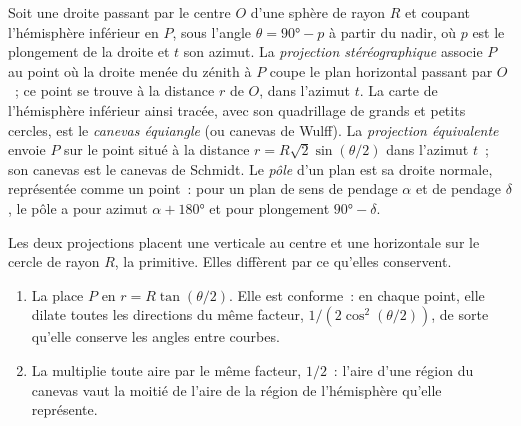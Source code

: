 \begin{definition}\label{def:b3:structural-analysis:stereo}
Soit une droite passant par le centre $O$ d'une sphère de rayon $R$ et coupant
l'hémisphère inférieur en $P$, sous l'angle $\theta = \ang{90} - p$ à partir du nadir, où
$p$ est le plongement de la droite et $t$ son azimut. La \emph{projection
stéréographique} associe $P$ au point où la
droite menée du zénith à $P$ coupe le plan horizontal passant par
$O$~; ce point se trouve à la distance $r$ de $O$, dans l'azimut $t$. La
carte de l'hémisphère inférieur ainsi tracée, avec son quadrillage de grands et petits
cercles, est le \emph{canevas équiangle} (ou
canevas de Wulff). La \emph{projection équivalente}
envoie $P$ sur le point situé à la distance $r =
R\sqrt2\sin(\theta/2)$ dans l'azimut $t$~; son canevas est le canevas de Schmidt. Le
\emph{pôle} d'un plan est sa droite normale, représentée comme
un point~: pour un plan de sens de pendage $\alpha$ et de pendage $\delta$, le pôle
a pour azimut $\alpha + \ang{180}$ et pour plongement $\ang{90} - \delta$.
\end{definition}

Les deux projections placent une verticale au centre et une horizontale sur
le cercle de rayon $R$, la primitive. Elles diffèrent par ce qu'elles conservent.

\begin{theorem}\label{thm:b3:structural-analysis:projections}
\begin{enumerate}[label=(\alph*)]
  \item La  place $P$ en $r = R\tan(\theta/2)$. Elle
        est conforme~: en chaque point, elle dilate toutes les directions du même
        facteur, $1/(2\cos^2(\theta/2))$, de sorte qu'elle conserve les angles entre
        courbes.
  \item La  multiplie toute aire par le même facteur,
        $1/2$~: l'aire d'une région du canevas vaut la moitié de l'aire de la région
        de l'hémisphère qu'elle représente.
\end{enumerate}
\end{theorem}


